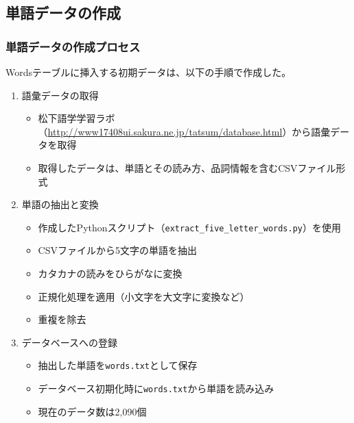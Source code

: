 \documentclass[a4j]{ujarticle}
\begin{document}
\subsection{単語データの作成}
\subsubsection{単語データの作成プロセス}
Wordsテーブルに挿入する初期データは、以下の手順で作成した。

\begin{enumerate}
  \item 語彙データの取得
  \begin{itemize}
    \item 松下語学学習ラボ（\url{http://www17408ui.sakura.ne.jp/tatsum/database.html}）から語彙データを取得
    \item 取得したデータは、単語とその読み方、品詞情報を含むCSVファイル形式
  \end{itemize}
  
  \item 単語の抽出と変換
  \begin{itemize}
    \item 作成したPythonスクリプト（\texttt{extract\_five\_letter\_words.py}）を使用
    \item CSVファイルから5文字の単語を抽出
    \item カタカナの読みをひらがなに変換
    \item 正規化処理を適用（小文字を大文字に変換など）
    \item 重複を除去
  \end{itemize}
  
  \item データベースへの登録
  \begin{itemize}
    \item 抽出した単語を\texttt{words.txt}として保存
    \item データベース初期化時に\texttt{words.txt}から単語を読み込み
    \item 現在のデータ数は2,090個
  \end{itemize}
\end{enumerate}
\end{document}
